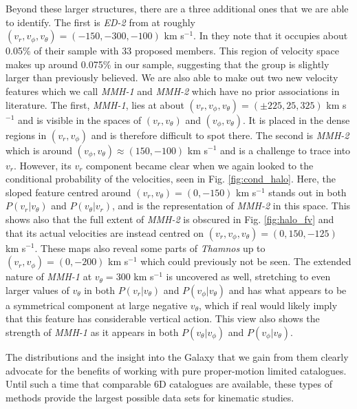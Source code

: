 Beyond these larger structures, there are a three additional ones that we are able to identify. The first is \textit{ED-2} from \cite{dodd:22} at roughly $(v_r, v_\phi, v_\theta) = (-150, -300, -100)$ km s$^{-1}$. In \cite{dodd:22} they note that it occupies about 0.05\% of their sample with 33 proposed members. This region of velocity space makes up around 0.075\% in our sample, suggesting that the group is slightly larger than previously believed. We are also able to make out two new velocity features which we call \textit{MMH-1} and \textit{MMH-2} which have no prior associations in literature. The first, \textit{MMH-1}, lies at about $(v_r, v_\phi, v_\theta) = (\pm225, 25, 325)$ km s$^{-1}$ and is visible in the spaces of $(v_r, v_\theta)$ and $(v_\phi, v_\theta)$. It is placed in the dense regions in $(v_r, v_\phi)$ and is therefore difficult to spot there. The second is \textit{MMH-2} which is around $(v_\phi, v_\theta) \approx (150, -100)$ km s$^{-1}$ and is a challenge to trace into $v_r$. However, its $v_r$ component became clear when we again looked to the conditional probability of the velocities, seen in Fig. \ref{fig:cond_halo}. Here, the sloped feature centred around $(v_r, v_\theta) = (0, -150)$ km s$^{-1}$ stands out in both $P(v_r|v_\theta)$ and $P(v_\theta|v_r)$, and is the representation of \textit{MMH-2} in this space. This shows also that the full extent of \textit{MMH-2} is obscured in Fig. \ref{fig:halo_fv} and that its actual velocities are instead centred on $(v_r, v_\phi, v_\theta) = (0, 150, -125)$ km s$^{-1}$.  These maps also reveal some parts of \textit{Thamnos} up to $(v_r, v_\phi) = (0, -200)$ km s$^{-1}$ which could previously not be seen. The extended nature of \textit{MMH-1} at $v_\theta = 300$ km s$^{-1}$ is uncovered as well, stretching to even larger values of $v_\theta$ in both $P(v_r|v_\theta)$ and $P(v_\phi|v_\theta)$ and has what appears to be a symmetrical component at large negative $v_\theta$, which if real would likely imply that this feature has considerable vertical action. This view also shows the strength of \textit{MMH-1} as it appears in both $P(v_\theta|v_\phi)$ and $P(v_\phi|v_\theta)$.

The distributions and the insight into the Galaxy that we gain from them clearly advocate for the benefits of working with pure proper-motion limited catalogues. Until such a time that comparable 6D catalogues are available, these types of methods provide the largest possible data sets for kinematic studies. 

